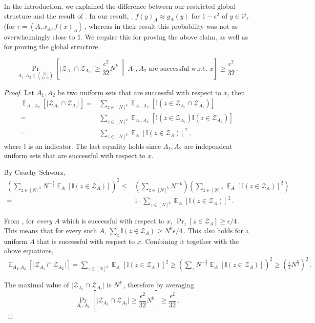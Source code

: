 \documentclass{toc}
\newcommand{\Prob}[2][]{\Pr_{{#1}}\left[#2\right]} %
\DeclareMathOperator*{\E}{\mathbb{E}} %
\newcommand{\Ex}[2][]{\E_{{#1}}\Brac{#2}} %
\newcommand{\Paren}[1]{\left(#1\right)} %
\newcommand{\Brac}[1]{\left[#1\right]} %
\newcommand{\abs}[1]{\lvert#1\rvert} %
\newcommand{\given}{\;\middle\vert\;} %
\newcommand{\Ind}{\mathbb I} %
\newcommand\f{f} %
\newcommand{\g}{g} %
\newcommand\cons{\mathcal{V}} %
\newcommand\rest[1]{{\bar{#1}}}  %
\newcommand\zi{\mathcal{Z}} %
\begin{document}
In the introduction, we explained the difference between our restricted global structure and the result of \cite{dinur2014direct}. In our result, , $\f(y)_\rest{A}\approx\g_A(y)$ for $1-\epsilon^2$ of $y\in \cons_\tau$ (for $\tau=(A,x_A,\f(x)_A)$\,, whereas in their result this probability was not as overwhelmingly close to $1$. We require this for proving the above claim, as well as for proving the global structure.

\begin{claim}\label{claim:sets joint cons inputs} 
	\[\Prob[A_1,A_2\in\binom{[k]}{k/10}]{\abs{\zi_{A_1}\cap\zi_{A_2}}\geq \frac{\epsilon^2}{32}N^k\given A_1,A_2 \textrm{ are successful w.r.t. }x } \geq \frac{\epsilon^2}{32} \,.\] %
\end{claim}
\begin{proof}
	Let $A_1,A_2$ be two uniform sets that are successful with respect to $x$, then
	\begin{align*}
	\Ex[A_1,A_2]{\abs{\zi_{A_1}\cap\zi_{A_2}}}=&\sum_{z\in[N]^k} \Ex[A_1,A_2]{\Ind(z\in\zi_{A_1}\cap\zi_{A_2})}\nonumber\\ =& 
	\sum_{z\in[N]^k}\Ex[A_1,A_2]{\Ind(z\in\zi_{A_1})\Ind(z\in \zi_{A_2})}
	\nonumber\\=&\sum_{z\in[N]^k} \Ex[A]{\Ind(z\in\zi_{A})}^2 \label{eq:avg sconn}\,,%
	\end{align*}
	where $\Ind$ is an indicator. The last equality holds since $A_1,A_2$ are independent uniform sets that are successful with respect to $x$.
	
	By Cauchy Schwarz, 
	\begin{align*}
	\Paren{\sum_{z\in[N]^k} N^{-\frac{k}{2}}\Ex[A]{\Ind(z\in\zi_{A})}}^2 \leq& \Paren{\sum_{z\in[N]^k}N^{-k}}\Paren{\sum_{z\in[N]^k}\Ex[A]{\Ind(z\in\zi_{A})}^2} \\
	=&1\cdot \sum_{z\in[N]^k}\Ex[A]{\Ind(z\in\zi_{A})}^2\,.%
	\end{align*}
	
	From , for \emph{every} $A$ which is successful with respect to $x$, $\Prob[z]{z\in\zi_{A}}\geq
\epsilon/4$\,. %
 This means that for every such $A$, $\sum_z\Ind(z\in\zi_A)\geq 
 N^k\epsilon/4$\,. %
 This also holds for a uniform $A$ that is successful with respect to $x$. Combining it together with the above equations,
	\begin{align*}
	\Ex[A_1,A_2]{\abs{\zi_{A_1}\cap\zi_{A_2}}} = \sum_{z\in[N]^k}\Ex[A]{\Ind(z\in\zi_{A})}^2
	\geq \Paren{\sum_z N^{-\frac{k}{2}}\Ex[A]{\Ind(z\in\zi_{A})}}^2
	\geq \Paren{\frac{\epsilon}{4}N^{\frac{k}{2}}}^2 \,.%
	\end{align*}
	
	The maximal value of $\abs{\zi_{A_1}\cap\zi_{A_2}}$ is $N^k$\,, therefore by averaging
	\[\Prob[A_1,A_2]{\abs{\zi_{A_1}\cap \zi_{A_2}} \geq \frac{\epsilon^2}{32} N^k} \geq \frac{\epsilon^2}{32}   \,.\]%
\end{proof}
\end{document}
